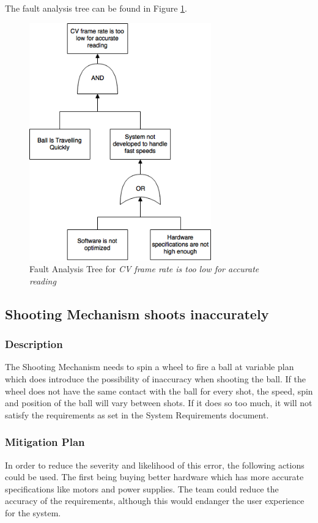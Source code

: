 \documentclass[11pt]{article}
\begin{document}
The fault analysis tree can be found in Figure \ref{fig:ft-cv}.

\begin{figure}[H]
   \centering
   \includegraphics[width=0.7\textwidth]{img/ft-cv.png} %
   \caption{Fault Analysis Tree for \textit{CV frame rate is too low for accurate reading}}
   \label{fig:ft-cv}
\end{figure}

\subsection{Shooting Mechanism shoots inaccurately}
\subsubsection*{Description}
The Shooting Mechanism needs to spin a wheel to fire a ball at variable plan which does introduce the possibility of inaccuracy when shooting the ball. If the wheel does not have the same contact with the ball for every shot, the speed, spin and position of the ball will vary between shots. If it does so too much, it will not satisfy the requirements as set in the System Requirements document.
\subsubsection*{Mitigation Plan}
In order to reduce the severity and likelihood of this error, the following actions could be used. The first being buying better hardware which has more accurate specifications like motors and power supplies. The team could reduce the accuracy of the requirements, although this would endanger the user experience for the system. 
\end{document}
